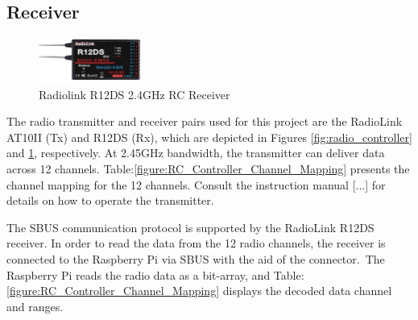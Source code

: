 \documentclass{article}
\begin{document}
\subsection{Receiver}
\begin{figure}[H]
  \centering
  \includegraphics[width=0.3\textwidth]{Pictures/reciever.png}
  \caption{Radiolink R12DS 2.4GHz RC Receiver}
  \label{fig:receiver}
\end{figure}
The radio transmitter and receiver pairs used for this project are the RadioLink AT10II (Tx) and R12DS (Rx), which are depicted in Figures \ref{fig:radio_controller} and \ref{fig:receiver}, respectively. At 2.45GHz bandwidth, the transmitter can deliver data across 12 channels. Table:\ref{figure:RC_Controller_Channel_Mapping} presents the 
channel mapping for the 12 channels. Consult the instruction manual [...] for details on how to operate the transmitter.

The SBUS communication protocol is supported by the RadioLink R12DS receiver. In order to read the data from the 12 radio channels, the receiver is connected to the Raspberry Pi via SBUS with the aid of the connector. The Raspberry Pi reads the radio data as a bit-array, and Table:\ref{figure:RC_Controller_Channel_Mapping}
displays the decoded data channel and ranges.
\end{document}
